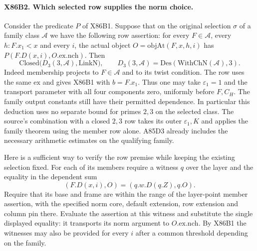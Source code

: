 \paragraph{X86B2. Which selected row supplies the norm choice.}
Consider the predicate $P$ of X86B1. Suppose that on the original
selection $\sigma$ of a family class $\mathcal A$ we have the
following row assertion: for every $F\in\mathcal A$, every
$h:F.x_1<x$ and every $i$, the actual object
$O=\mathrm{objAt}(F,x,h,i)$ has $P(F.D(x,i),O.\mathrm{ex}.\mathrm{nch})$.
Then
\[
       \mathrm{Closed}\bigl(D_3(3,\mathcal A),\mathrm{LinkN}\bigr),
       \qquad D_3(3,\mathcal A)=
                  \mathrm{Des}(\mathrm{WithChN}(\mathcal A),3).
\]
Indeed membership projects to $F\in\mathcal A$ and to its twist
condition. The row uses the same $\mathrm{ex}$ and gives X86B1 with
$b=F.x_1$. Thus one may take $\varepsilon_1=1$ and the transport
parameter with all four components zero, uniformly before $F,C_H$.
The family output constants still have their permitted dependence.
In particular this deduction uses no separate bound for primes
$2,3$ on the selected class. The source's combination with a closed
$2,3$ row takes its outer $\varepsilon_1,K$ and applies the
family theorem using the member row alone. A85D3 already includes
the necessary arithmetic estimates on the qualifying family.

Here is a sufficient way to verify the row premise while keeping
the existing selection fixed. For each of its members require a
witness $q$ over the layer and the equality in the dependent sum
\[
        (F.D(x,i),O)=(q.w.D(q.Z),q.O).
\]
Require that its base and frame are within the range of the
layer-point member assertion, with the specified norm core, default
extension, row extension and column pin there. Evaluate the assertion
at this witness and substitute the single displayed equality:
it transports its norm argument to $O.\mathrm{ex}.\mathrm{nch}$.
By X86B1 the witnesses may also be provided for every $i$ after a
common threshold depending on the family.

